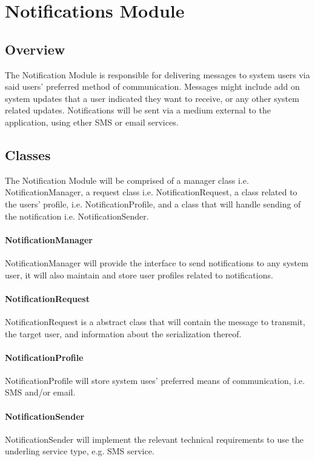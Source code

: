\section{Notifications Module}

\subsection{Overview}
The Notification Module is responsible for delivering  messages to system users via said users' preferred method of communication. Messages might include add on system updates that a user indicated they want to receive, or any other system related updates. Notifications will be sent via a medium external to the application, using ether SMS or email services.

\subsection{Classes}
The Notification Module will be comprised of a manager class i.e. NotificationManager, a request class i.e. NotificationRequest, a class related to the users' profile, i.e. NotificationProfile, and a class that will handle sending of the notification i.e. NotificationSender.

\paragraph{NotificationManager}
NotificationManager will provide the interface to send notifications to any system user, it will also maintain and store user profiles related to notifications.

\paragraph{NotificationRequest}
NotificationRequest is a abstract class that will contain the message to transmit, the target user, and information about the serialization thereof.

\paragraph{NotificationProfile}
NotificationProfile will store system uses' preferred means of communication, i.e. SMS and/or email.

\paragraph{NotificationSender}
NotificationSender will implement the relevant technical requirements to use the underling service type, e.g. SMS service.


